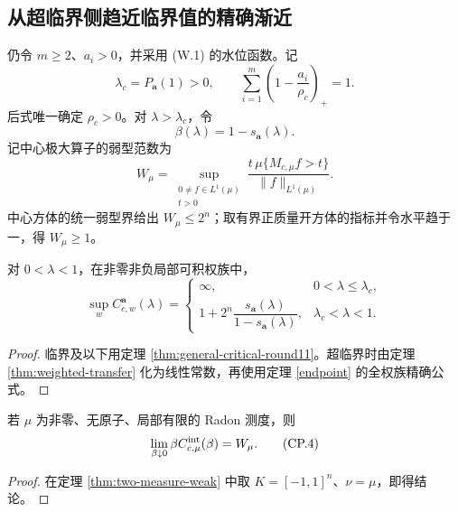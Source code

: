 \subsection{从超临界侧趋近临界值的精确渐近}\label{subsec:critical-pole}

仍令 $m\ge2$、$a_i>0$，并采用 \textup{(W.1)} 的水位函数。记
\[
 \lambda_c=P_{\boldsymbol a}(1)>0,
 \qquad \sum_{i=1}^m\left(1-\frac{a_i}{\rho_c}\right)_+=1.
 \tag{CP.1}
\]
后式唯一确定 $\rho_c>0$。对 $\lambda>\lambda_c$，令
\[
 \beta(\lambda)=1-s_{\boldsymbol a}(\lambda).
 \tag{CP.2}
\]
记中心极大算子的弱型范数为
\[
 W_\mu=\sup_{\substack{0\ne f\in L^1(\mu)\\ t>0}}
 \frac{t\,\mu\{M_{c,\mu}f>t\}}{\|f\|_{L^1(\mu)}}.
 \tag{CP.3}
\]
中心方体的统一弱型界给出 $W_\mu\le2^n$；取有界正质量开方体的指标并令水平趋于一，得 $W_\mu\ge1$。

\begin{corollary}[全权族的全阈值公式]
对 $0<\lambda<1$，在非零非负局部可积权族中，
\[
\sup_w C_{c,w}^{\boldsymbol a}(\lambda)=
\begin{cases}
\infty,&0<\lambda\le\lambda_c,\\
1+2^n\dfrac{s_{\boldsymbol a}(\lambda)}{1-s_{\boldsymbol a}(\lambda)},&\lambda_c<\lambda<1.
\end{cases}
\tag{PH.1}
\]
\end{corollary}
\begin{proof}
临界及以下用定理 \ref{thm:general-critical-round11}。超临界时由定理 \ref{thm:weighted-transfer} 化为线性常数，再使用定理 \ref{endpoint} 的全权族精确公式。
\end{proof}

\begin{lemma}[小阈值指标函数的弱型范数]\label{lem:small-level-weak-norm}
若 $\mu$ 为非零、无原子、局部有限的 Radon 测度，则
\[
 \lim_{\beta\downarrow0}\beta C^{\rm int}_{c,\mu}(\beta)=W_\mu.
 \tag{CP.4}
\]
\end{lemma}

\begin{proof}
在定理 \ref{thm:two-measure-weak} 中取 $K=[-1,1]^n$、$\nu=\mu$，即得结论。
\end{proof}


